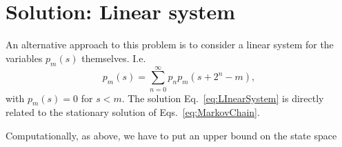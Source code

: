 \documentclass[a4paper,11pt]{article}
\begin{document}
\section*{Solution: Linear system}
An alternative approach to this problem is to consider a linear system for the variables $p_m(s)$ themselves.
I.e.
\begin{equation}
p_m(s) = \sum_{n=0}^\infty p_n p_m(s + 2^n-m),
\label{eq:LInearSystem}
\end{equation}
with $p_m(s) = 0$ for $s<m$.
The solution Eq.~\eqref{eq:LInearSystem} is directly related to the stationary solution of Eqs.~\eqref{eq:MarkovChain}.

Computationally, as above, we have to put an upper bound on the state space
\end{document}
